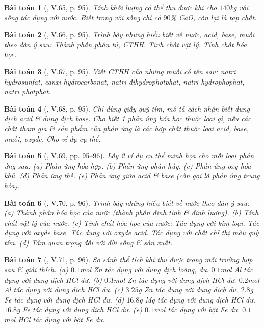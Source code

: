 \documentclass{article}
\newtheorem{baitoan}{Bài toán}
\begin{document}
\begin{baitoan}[\cite{Truong_BTNC_Hoa_Hoc_8_2022}, V.65, p. 95]
	Tính khối lượng \emph{} có thể thu được khi cho $140$\emph{kg} vôi sống tác dụng với nước. Biết trong vôi sống chỉ có $90$\% \emph{CaO}, còn lại là tạp chất.
\end{baitoan}

\begin{baitoan}[\cite{Truong_BTNC_Hoa_Hoc_8_2022}, V.66, p. 95]
	Trình bày những hiểu biết về nước, acid, base, muối theo dàn ý sau: Thành phần phân tử, CTHH. Tính chất vật lý. Tính chất hóa học.
\end{baitoan}

\begin{baitoan}[\cite{Truong_BTNC_Hoa_Hoc_8_2022}, V.67, p. 95]
	Viết CTHH của những muối có tên sau: natri hydrosunfat, canxi hydrocarbonat, natri đihydrophotphat, natri hydrophophat, natri photphat.
\end{baitoan}

\begin{baitoan}[\cite{Truong_BTNC_Hoa_Hoc_8_2022}, V.68, p. 95]
	Chỉ dùng giấy quỳ tím, mô tả cách nhận biết dung dịch acid \& dung dịch base. Cho biết 1 phản ứng hóa học thuộc loại gì, nếu các chất tham gia \& sản phẩm của phản ứng là các hợp chất thuộc loại acid, base, muối, oxyde. Cho ví dụ cụ thể.
\end{baitoan}

\begin{baitoan}[\cite{Truong_BTNC_Hoa_Hoc_8_2022}, V.69, pp. 95--96]
	Lấy 2 ví dụ cụ thể minh họa cho mỗi loại phản ứng sau: (a) Phản ứng hóa hợp. (b) Phản ứng phân hủy. (c) Phản ứng oxy hóa--khử. (d) Phản ứng thế. (e) Phản ứng giữa acid \& base (còn gọi là \emph{phản ứng trung hòa}).
\end{baitoan}

\begin{baitoan}[\cite{Truong_BTNC_Hoa_Hoc_8_2022}, V.70, p. 96]
	Trình bày những hiểu biết về nước theo dàn ý sau: (a) Thành phần hóa học của nước (thành phần định tính \& định lượng). (b) Tính chất vật lý của nước. (c) Tính chất hóa học của nước: Tác dụng với kim loại. Tác dụng với oxyde base. Tác dụng với oxyde acid. Tác dụng với chất chỉ thị màu quỳ tím. (d) Tầm quan trọng đối với đời sống \& sản xuất.
\end{baitoan}

\begin{baitoan}[\cite{Truong_BTNC_Hoa_Hoc_8_2022}, V.71, p. 96]
	So sánh thể tích khí \emph{} thu được trong mỗi trường hợp sau \& giải thích. (a) $0.1$\emph{mol Zn} tác dụng với dung dịch \emph{} loãng, dư. $0.1$\emph{mol Al} tác dụng với dung dịch \emph{HCl} dư. (b) $0.3$\emph{mol Zn} tác dụng với dung dịch \emph{HCl} dư. $0.2$\emph{mol Al} tác dụng với dung dịch \emph{HCl} dư. (c) $3.25$\emph{g Zn} tác dụng với dung dịch \emph{} dư. $2.8$\emph{g Fe} tác dụng với dung dịch \emph{HCl} dư. (d) $16.8$\emph{g Mg} tác dụng với dung dịch \emph{HCl} dư. $16.8$\emph{g Fe} tác dụng với dung dịch \emph{HCl} dư. (e) $0.1$\emph{mol } tác dụng với bột \emph{Fe} dư. $0.1$\emph{mol HCl} tác dụng với bột \emph{Fe} dư.
\end{baitoan}
\end{document}
